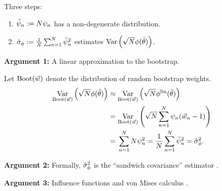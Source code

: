 

\begin{frame}[t]{Three steps:}

\begin{enumerate}
    \item $\tilde{\psi}_n := N \psi_n$ has a non-degenerate distribution.
    \item $\hat\sigma_{\phi} := \frac{1}{N}\sum_{n=1}^N \tilde{\psi}_n^2$ estimates
        $\underset{}{\mathrm{Var}}\left(\sqrt{N}\phi(\hat{\theta})\right)$.
\end{enumerate}


\textbf{Argument 1:} A linear approximation to the bootstrap.

Let $\mathrm{Boot}(\vec{w})$ denote the distribution of random bootstrap weights.
%
\begin{align*}
%
\var{\mathrm{Boot}(\w)}{\sqrt{N} \thetafun(\thetahat)}
\approx{}&
\var{\mathrm{Boot}(\w)}{\sqrt{N} \thetafunlin(\thetahat)}
\\={}&
\var{\mathrm{Boot}(\w)}{\sqrt{N} \sumn \infl_n (\w_n - 1)}
\\={}&
\sumn N \infl_n^2
={}
\meann \inflbar_n^2
={} \noise^2.
%
\end{align*}
%

\textbf{Argument 2:} Formally, $\hat\sigma_{\phi}^2$ is the ``sandwich covariance''
estimator \citep{huber1967sandwich, stefanski:2002:mestimation}.

\textbf{Argument 3:} Influence functions and von Mises calculus
\citep{mises1947asymptotic, reeds1976thesis}.

\end{frame}



